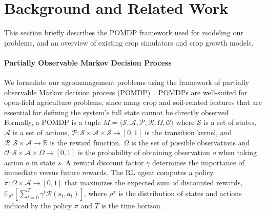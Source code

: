 \section{Background and Related Work}
\label{sec:related}

This section briefly describes the POMDP framework used for modeling our problems, and an overview of existing crop simulators and crop growth models. 
\paragraph{Partially Observable Markov Decision Process} We formulate our agromanagement problems using the framework of partially observable Markov decision process (POMDP)~\citep{kaelbling_planning_1998}.
POMDPs are well-suited for open-field agriculture problems, since many crop and soil-related features that are essential for defining the system's full state cannot be directly observed~\citep{tao_optimizing_2023}. Formally, a POMDP is a tuple $M=\langle \mathcal{S}, \mathcal{A}, \mathcal{P}, \mathcal{R}, \Omega, \mathcal{O} \rangle$ where $\mathcal{S}$ is a set of states, $\mathcal{A}$ is a set of actions, $\mathcal{P}:\mathcal{S}\times \mathcal{A}\times\mathcal{S}\to[0,1]$ is the transition kernel, and $\mathcal{R}:\mathcal{S}\times\mathcal{A}\to\mathbb{R}$ is the reward function. $\Omega$ is the set of possible observations and $\mathcal{O}:\mathcal{S}\times\mathcal{A}\times\Omega\to[0,1]$ is the probability of obtaining observation $o$ when taking action $a$ in state $s$. A reward discount factor $\gamma$ determines the importance of immediate versus future rewards. The RL agent computes a policy $\pi:\Omega\times \mathcal{A}\to[0,1]$ that maximizes the expected sum of discounted rewards, $\mathbb{E}_{\rho^\pi}\left[\sum_{t=0}^T\gamma^t\mathcal{R}(s_t,a_t)\right]$, where $\rho^\pi$ is the distribution of states and actions induced by the policy $\pi$ and $T$ is the time horizon. 

